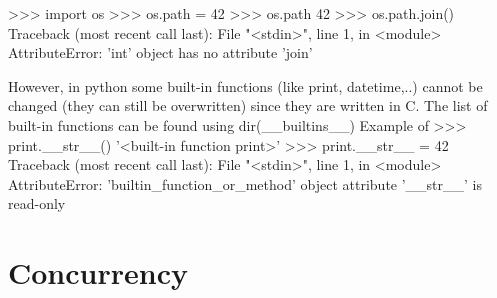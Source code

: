 \documentclass[12pt,a4paper,twocolumn]{scrartcl}
\begin{document}
>>> import os
>>> os.path = 42
>>> os.path
42
>>> os.path.join()
Traceback (most recent call last):
  File "<stdin>", line 1, in <module>
AttributeError: 'int' object has no attribute 'join'

However, in python some built-in functions (like print, datetime,..) cannot be changed (they can still be overwritten) since they are written in C.
The list of built-in functions can be found using dir(__builtins__)
Example of 
>>> print.__str__()
'<built-in function print>'
>>> print.__str__ = 42
Traceback (most recent call last):
  File "<stdin>", line 1, in <module>
AttributeError: 'builtin_function_or_method' object attribute '__str__' is read-only



\section{Concurrency}
\end{document}

